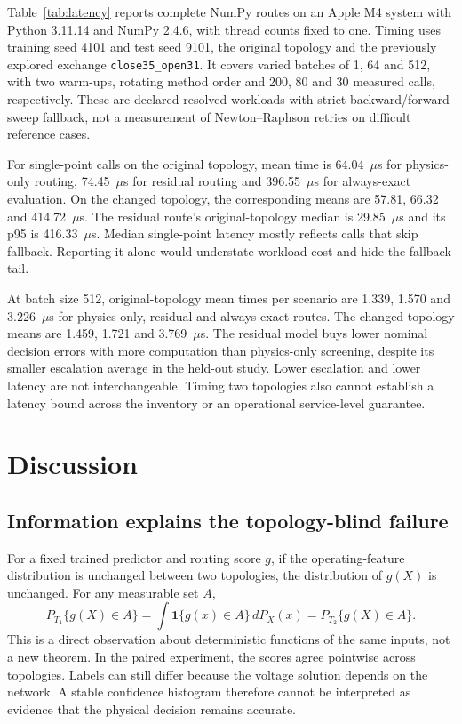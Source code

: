 Table~\ref{tab:latency} reports complete NumPy routes on an Apple M4 system with Python 3.11.14 and NumPy 2.4.6, with thread counts fixed to one. Timing uses training seed 4101 and test seed 9101, the original topology and the previously explored exchange \texttt{close35\_open31}. It covers varied batches of 1, 64 and 512, with two warm-ups, rotating method order and 200, 80 and 30 measured calls, respectively. These are declared resolved workloads with strict backward/forward-sweep fallback, not a measurement of Newton--Raphson retries on difficult reference cases.



For single-point calls on the original topology, mean time is 64.04~$\mu$s for physics-only routing, 74.45~$\mu$s for residual routing and 396.55~$\mu$s for always-exact evaluation. On the changed topology, the corresponding means are 57.81, 66.32 and 414.72~$\mu$s. The residual route's original-topology median is 29.85~$\mu$s and its p95 is 416.33~$\mu$s. Median single-point latency mostly reflects calls that skip fallback. Reporting it alone would understate workload cost and hide the fallback tail.

At batch size 512, original-topology mean times per scenario are 1.339, 1.570 and 3.226~$\mu$s for physics-only, residual and always-exact routes. The changed-topology means are 1.459, 1.721 and 3.769~$\mu$s. The residual model buys lower nominal decision errors with more computation than physics-only screening, despite its smaller escalation average in the held-out study. Lower escalation and lower latency are not interchangeable. Timing two topologies also cannot establish a latency bound across the inventory or an operational service-level guarantee.

\section{Discussion}
\label{sec:discussion}

\subsection{Information explains the topology-blind failure}

For a fixed trained predictor and routing score $g$, if the operating-feature distribution is unchanged between two topologies, the distribution of $g(X)$ is unchanged. For any measurable set $A$,
\begin{equation}
 P_{T_1}\{g(X)\in A\}
 =\int\mathbf{1}\{g(x)\in A\}\,dP_X(x)
 =P_{T_2}\{g(X)\in A\}.
\end{equation}
This is a direct observation about deterministic functions of the same inputs, not a new theorem. In the paired experiment, the scores agree pointwise across topologies. Labels can still differ because the voltage solution depends on the network. A stable confidence histogram therefore cannot be interpreted as evidence that the physical decision remains accurate.

